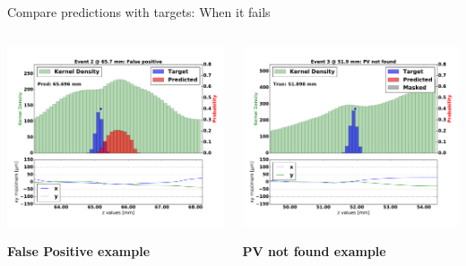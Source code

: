 \begin{frame}{Compare predictions with targets: When it fails}
  \begin{columns}[c]
        \begin{center}
           \includegraphics[width=1\textwidth, trim=60 40 60 20]{images/07Jan19_AltCNN4Layer_D35_sp_10.pdf}

           \textbf{\color{lhcbRed}\large False Positive example}
        \end{center}
        \begin{center}
           \includegraphics[width=1\textwidth, trim=60 40 60 20]{images/07Jan19_AltCNN4Layer_D35_sp_15.pdf}

           \textbf{\color{lhcbRed}\large PV not found example}
       \end{center}
  \end{columns}
\end{frame}
